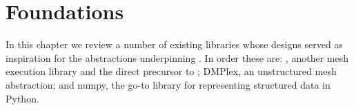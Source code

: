 \documentclass[thesis]{subfiles}
\begin{document}
\chapter{Foundations}

In this chapter we review a number of existing libraries whose designs served as inspiration for the abstractions underpinning .
In order these are:
, another mesh execution library and the direct precursor to ;
DMPlex, an unstructured mesh abstraction;
and numpy, the go-to library for representing structured data in Python.

\section{}




%
%




\cite{stroutSparsePolyhedralFramework2018} %
\cite{mirchandaneyPrinciplesRuntimeSupport1988} %
\cite{arenazInspectorExecutorAlgorithmIrregular2004} %
\end{document}
